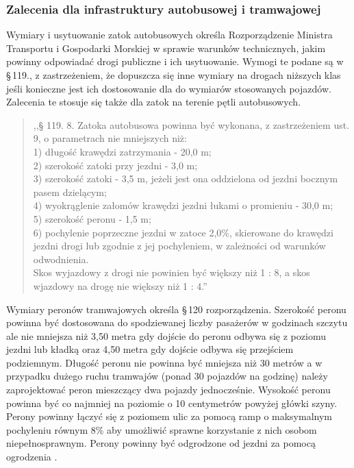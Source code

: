 \documentclass[twoside,12pt]{article}
\begin{document}
	\subsubsection{Zalecenia dla infrastruktury autobusowej i tramwajowej}
	Wymiary i usytuowanie zatok autobusowych określa Rozporządzenie Ministra Transportu i Gospodarki Morskiej w sprawie warunków technicznych, jakim powinny odpowiadać drogi publiczne i ich usytuowanie. Wymogi te podane są w §\,119., z zastrzeżeniem, że dopuszcza się inne wymiary na drogach niższych klas jeśli konieczne jest ich dostosowanie dla do wymiarów stosowanych pojazdów. Zalecenia te stosuje się także dla zatok na terenie pętli autobusowych.
	\begin{quote}
	,,§ 119. 8. Zatoka autobusowa powinna być wykonana, z zastrzeżeniem ust. 9, o parametrach nie mniejszych niż: \\
1)	długość krawędzi zatrzymania - 20,0 m; \\
2)	szerokość zatoki przy jezdni - 3,0 m; \\
3)	szerokość zatoki - 3,5 m, jeżeli jest ona oddzielona od jezdni bocznym pasem dzielącym; \\
4)	wyokrąglenie załomów krawędzi jezdni łukami o promieniu - 30,0 m; \\
5)	szerokość peronu - 1,5 m; \\
6)	pochylenie poprzeczne jezdni w zatoce 2,0\%, skierowane do krawędzi jezdni drogi lub zgodnie z jej pochyleniem, w zależności od warunków odwodnienia. \\
Skos wyjazdowy z drogi nie powinien być większy niż 1 : 8, a skos wjazdowy na drogę nie większy niż 1 : 4.'' \cite{rozporzadzenie_drogi}
	\end{quote}%
	
	Wymiary peronów tramwajowych określa §\,120 rozporządzenia. Szerokość peronu powinna być dostosowana do spodziewanej liczby pasażerów w godzinach szczytu ale nie mniejsza niż 3,50 metra gdy dojście do peronu odbywa się z poziomu jezdni lub kładką oraz 4,50 metra gdy dojście odbywa się przejściem podziemnym. Długość peronu nie powinna być mniejsza niż 30 metrów a w przypadku dużego ruchu tramwajów (ponad 30 pojazdów na godzinę) należy zaprojektować peron mieszczący dwa pojazdy jednocześnie. Wysokość peronu powinna być co najmniej na poziomie o 10 centymetrów powyżej główki szyny. Perony powinny łączyć się z poziomem ulic za pomocą ramp o maksymalnym pochyleniu równym 8\% aby umożliwić sprawne korzystanie z nich osobom niepełnosprawnym. Perony powinny być odgrodzone od jezdni za pomocą ogrodzenia \cite{rozporzadzenie_drogi}.
	
\end{document}
